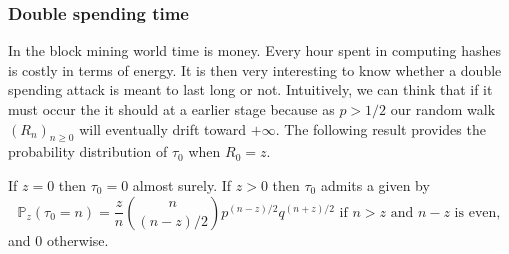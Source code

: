 \subsubsection{Double spending time}\label{sssec:double_spending_rw_dst}
In the block mining world time is money. Every hour spent in computing hashes is costly in terms of energy. It is then very interesting to know whether a double spending attack is meant to last long or not. Intuitively, we can think that if it must occur the it should at a earlier stage because as $p>1/2$ our random walk $(R_n)_{n\geq0}$ will eventually drift toward $+\infty$. The following result provides the probability distribution of $\tau_0$ when $R_0 = z$.
\begin{theo}
If $z = 0$ then $\tau_0=0$ almost surely. If $z>0$ then $\tau_0$ admits a \pmf given by 
$$
\mathbb{P}_z(\tau_0 = n)=
\frac{z}{n}\binom{n}{(n-z) / 2}p^{(n-z) / 2}q^{(n
+z) / 2}\text{ if }n>z\text{ and }n-z\text{ is even},
$$
and $0$ otherwise.
\end{theo}
